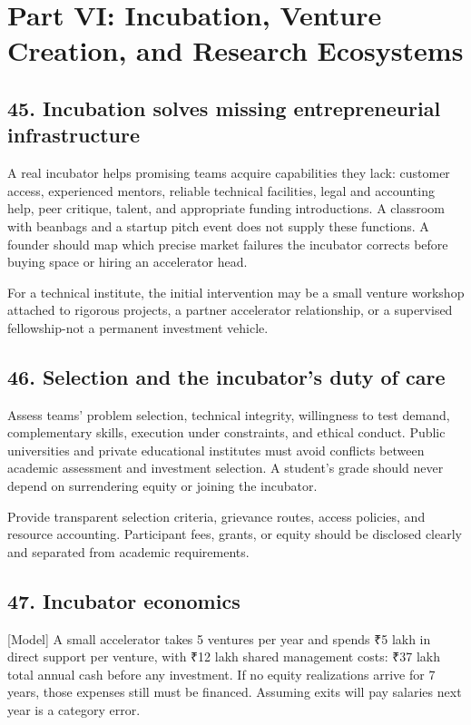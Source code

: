 \section{Part VI: Incubation, Venture Creation, and Research Ecosystems}

\subsection{45. Incubation solves missing entrepreneurial infrastructure}

A real incubator helps promising teams acquire capabilities they lack: customer access, experienced mentors, reliable technical facilities, legal and accounting help, peer critique, talent, and appropriate funding introductions. A classroom with beanbags and a startup pitch event does not supply these functions. A founder should map which precise market failures the incubator corrects before buying space or hiring an accelerator head.

For a technical institute, the initial intervention may be a small venture workshop attached to rigorous projects, a partner accelerator relationship, or a supervised fellowship-not a permanent investment vehicle.

\subsection{46. Selection and the incubator's duty of care}

Assess teams' problem selection, technical integrity, willingness to test demand, complementary skills, execution under constraints, and ethical conduct. Public universities and private educational institutes must avoid conflicts between academic assessment and investment selection. A student's grade should never depend on surrendering equity or joining the incubator.

Provide transparent selection criteria, grievance routes, access policies, and resource accounting. Participant fees, grants, or equity should be disclosed clearly and separated from academic requirements.

\subsection{47. Incubator economics}

[Model] A small accelerator takes 5 ventures per year and spends ₹5 lakh in direct support per venture, with ₹12 lakh shared management costs: ₹37 lakh total annual cash before any investment. If no equity realizations arrive for 7 years, those expenses still must be financed. Assuming exits will pay salaries next year is a category error.

